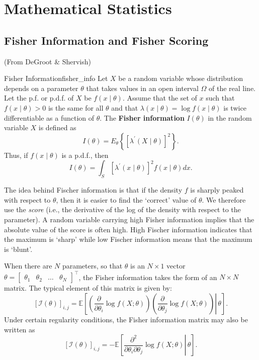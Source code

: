 \documentclass[11pt, %
	oneside, %
	english, %
	onehalfspacing, %
	]{article} %
\numberwithin{equation}{section}
\begin{document}
\clearpage


\appendix
\section{Mathematical Statistics}

\subsection{Fisher Information and Fisher Scoring}\label{appendix:fisher}

(From DeGroot \& Shervish)

\begin{definition}{Fisher Information}{fisher_info}
    Let $X$ be a random variable whose distribution depends on a parameter $\theta$ that takes values in an open interval $\Omega$ of the real line. Let the p.f. or p.d.f. of $X$ be $f(x \mid \theta)$. Assume that the set of $x$ such that $f(x \mid \theta)>0$ is the same for all $\theta$ and that $\lambda(x \mid \theta)=\log f(x \mid \theta)$ is twice differentiable as a function of $\theta$. The \textbf{Fisher information} $I(\theta)$ in the random variable $X$ is defined as
    $$
    I(\theta)=E_\theta\left\{\left[\lambda^{\prime}(X \mid \theta)\right]^2\right\} .
    $$
    Thus, if $f(x \mid \theta)$ is a p.d.f., then
    $$
    I(\theta)=\int_S\left[\lambda^{\prime}(x \mid \theta)\right]^2 f(x \mid \theta) d x .
    $$
\end{definition}

The idea behind Fischer information is that if the density $f$ is sharply peaked with respect to $\theta$, then it is easier to find the `correct' value of $\theta$. We therefore use the \emph{score} (i.e., the derivative of the log of the density with respect to the parameter). A random variable carrying high Fisher information implies that the absolute value of the score is often high. High Fischer information indicates that the maximum is `sharp' while low Fischer information means that the maximum is `blunt'.


When there are $N$ parameters, so that $\theta$ is an $N \times 1$ vector $\theta=\left[\begin{array}{llll}\theta_1 & \theta_2 & \ldots & \theta_N\end{array}\right]^{\top}$, the Fisher information takes the form of an $N \times N$ matrix. The typical element of this matrix is given by:
$$
[\mathcal{I}(\theta)]_{i, j}=\mathbb{E}\left[\left.\left(\frac{\partial}{\partial \theta_i} \log f(X ; \theta)\right)\left(\frac{\partial}{\partial \theta_j} \log f(X ; \theta)\right) \right\rvert\, \theta\right] .
$$
Under certain regularity conditions, the Fisher information matrix may also be written as
\begin{equation}\label{eq:fisher_matrix}
    [\mathcal{I}(\theta)]_{i, j}=-\mathbb{E}\left[\left.\frac{\partial^2}{\partial \theta_i \partial \theta_j} \log f(X ; \theta) \right\rvert\, \theta\right] .
\end{equation}
\end{document}
